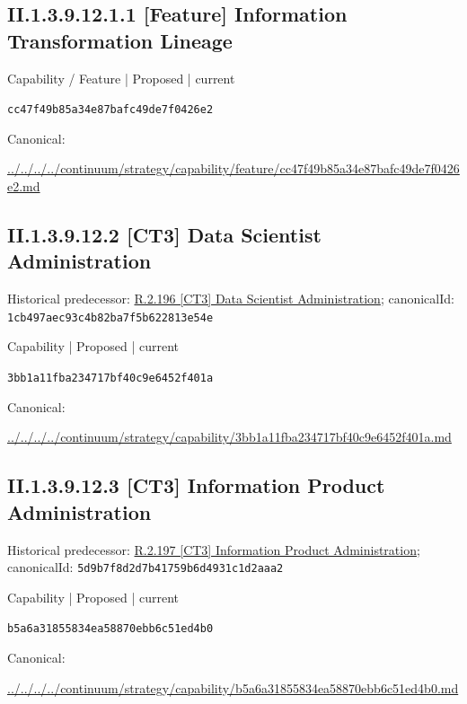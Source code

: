 \documentclass[10pt,a4paper]{article}
\begin{document}
\subsection*{II.1.3.9.12.1.1 [Feature] Information Transformation Lineage}
\label{element-cc47f49b85a34e87bafc49de7f0426e2}
{\small Capability / Feature | Proposed | current}\par
\texttt{cc47f49b85a34e87bafc49de7f0426e2}\par
Canonical: \par
{\footnotesize\url{../../../../continuum/strategy/capability/feature/cc47f49b85a34e87bafc49de7f0426e2.md}}\par
\subsection*{II.1.3.9.12.2 [CT3] Data Scientist Administration}
Historical predecessor: \hyperref[element-1cb497aec93c4b82ba7f5b622813e54e]{R.2.196 [CT3] Data Scientist Administration}; canonicalId: \texttt{1cb497aec93c4b82ba7f5b622813e54e}\par
\label{element-3bb1a11fba234717bf40c9e6452f401a}
{\small Capability | Proposed | current}\par
\texttt{3bb1a11fba234717bf40c9e6452f401a}\par
Canonical: \par
{\footnotesize\url{../../../../continuum/strategy/capability/3bb1a11fba234717bf40c9e6452f401a.md}}\par
\subsection*{II.1.3.9.12.3 [CT3] Information Product Administration}
Historical predecessor: \hyperref[element-5d9b7f8d2d7b41759b6d4931c1d2aaa2]{R.2.197 [CT3] Information Product Administration}; canonicalId: \texttt{5d9b7f8d2d7b41759b6d4931c1d2aaa2}\par
\label{element-b5a6a31855834ea58870ebb6c51ed4b0}
{\small Capability | Proposed | current}\par
\texttt{b5a6a31855834ea58870ebb6c51ed4b0}\par
Canonical: \par
{\footnotesize\url{../../../../continuum/strategy/capability/b5a6a31855834ea58870ebb6c51ed4b0.md}}\par
\end{document}
